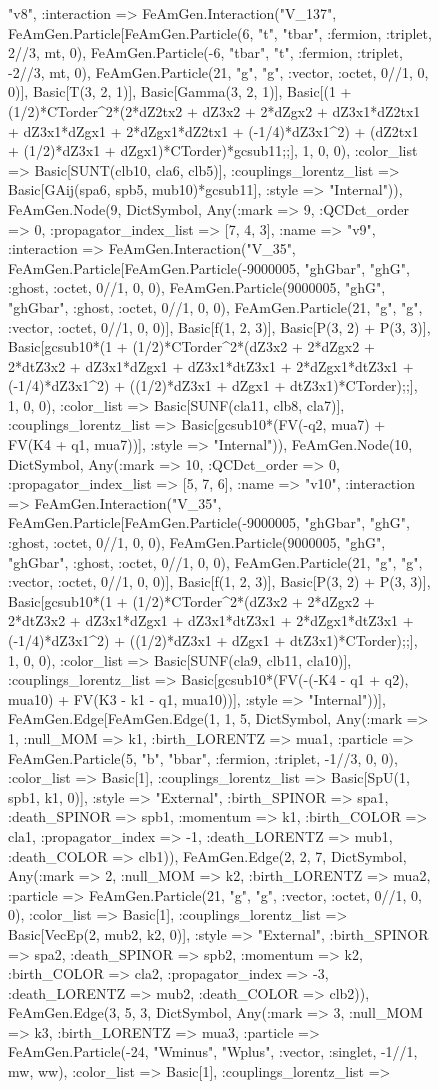 \documentclass{revtex4}
\begin{document}
\begin{figure}[!htb]
\begin{center}
{"v8", :interaction => FeAmGen.Interaction("V_137", FeAmGen.Particle[FeAmGen.Particle(6, "t", "tbar", :fermion, :triplet, 2//3, mt, 0), FeAmGen.Particle(-6, "tbar", "t", :fermion, :triplet, -2//3, mt, 0), FeAmGen.Particle(21, "g", "g", :vector, :octet, 0//1, 0, 0)], Basic[T(3, 2, 1)], Basic[Gamma(3, 2, 1)], Basic[(1 + (1/2)*CTorder^2*(2*dZ2tx2 + dZ3x2 + 2*dZgx2 + dZ3x1*dZ2tx1 + dZ3x1*dZgx1 + 2*dZgx1*dZ2tx1 + (-1/4)*dZ3x1^2) + (dZ2tx1 + (1/2)*dZ3x1 + dZgx1)*CTorder)*gcsub11;;], 1, 0, 0), :color_list => Basic[SUNT(clb10, cla6, clb5)], :couplings_lorentz_list => Basic[GAij(spa6, spb5, mub10)*gcsub11], :style => "Internal")), FeAmGen.Node(9, Dict{Symbol, Any}(:mark => 9, :QCDct_order => 0, :propagator_index_list => [7, 4, 3], :name => "v9", :interaction => FeAmGen.Interaction("V_35", FeAmGen.Particle[FeAmGen.Particle(-9000005, "ghGbar", "ghG", :ghost, :octet, 0//1, 0, 0), FeAmGen.Particle(9000005, "ghG", "ghGbar", :ghost, :octet, 0//1, 0, 0), FeAmGen.Particle(21, "g", "g", :vector, :octet, 0//1, 0, 0)], Basic[f(1, 2, 3)], Basic[P(3, 2) + P(3, 3)], Basic[gcsub10*(1 + (1/2)*CTorder^2*(dZ3x2 + 2*dZgx2 + 2*dtZ3x2 + dZ3x1*dZgx1 + dZ3x1*dtZ3x1 + 2*dZgx1*dtZ3x1 + (-1/4)*dZ3x1^2) + ((1/2)*dZ3x1 + dZgx1 + dtZ3x1)*CTorder);;], 1, 0, 0), :color_list => Basic[SUNF(cla11, clb8, cla7)], :couplings_lorentz_list => Basic[gcsub10*(FV(-q2, mua7) + FV(K4 + q1, mua7))], :style => "Internal")), FeAmGen.Node(10, Dict{Symbol, Any}(:mark => 10, :QCDct_order => 0, :propagator_index_list => [5, 7, 6], :name => "v10", :interaction => FeAmGen.Interaction("V_35", FeAmGen.Particle[FeAmGen.Particle(-9000005, "ghGbar", "ghG", :ghost, :octet, 0//1, 0, 0), FeAmGen.Particle(9000005, "ghG", "ghGbar", :ghost, :octet, 0//1, 0, 0), FeAmGen.Particle(21, "g", "g", :vector, :octet, 0//1, 0, 0)], Basic[f(1, 2, 3)], Basic[P(3, 2) + P(3, 3)], Basic[gcsub10*(1 + (1/2)*CTorder^2*(dZ3x2 + 2*dZgx2 + 2*dtZ3x2 + dZ3x1*dZgx1 + dZ3x1*dtZ3x1 + 2*dZgx1*dtZ3x1 + (-1/4)*dZ3x1^2) + ((1/2)*dZ3x1 + dZgx1 + dtZ3x1)*CTorder);;], 1, 0, 0), :color_list => Basic[SUNF(cla9, clb11, cla10)], :couplings_lorentz_list => Basic[gcsub10*(FV(-(-K4 - q1 + q2), mua10) + FV(K3 - k1 - q1, mua10))], :style => "Internal"))], FeAmGen.Edge[FeAmGen.Edge(1, 1, 5, Dict{Symbol, Any}(:mark => 1, :null_MOM => k1, :birth_LORENTZ => mua1, :particle => FeAmGen.Particle(5, "b", "bbar", :fermion, :triplet, -1//3, 0, 0), :color_list => Basic[1], :couplings_lorentz_list => Basic[SpU(1, spb1, k1, 0)], :style => "External", :birth_SPINOR => spa1, :death_SPINOR => spb1, :momentum => k1, :birth_COLOR => cla1, :propagator_index => -1, :death_LORENTZ => mub1, :death_COLOR => clb1)), FeAmGen.Edge(2, 2, 7, Dict{Symbol, Any}(:mark => 2, :null_MOM => k2, :birth_LORENTZ => mua2, :particle => FeAmGen.Particle(21, "g", "g", :vector, :octet, 0//1, 0, 0), :color_list => Basic[1], :couplings_lorentz_list => Basic[VecEp(2, mub2, k2, 0)], :style => "External", :birth_SPINOR => spa2, :death_SPINOR => spb2, :momentum => k2, :birth_COLOR => cla2, :propagator_index => -3, :death_LORENTZ => mub2, :death_COLOR => clb2)), FeAmGen.Edge(3, 5, 3, Dict{Symbol, Any}(:mark => 3, :null_MOM => k3, :birth_LORENTZ => mua3, :particle => FeAmGen.Particle(-24, "Wminus", "Wplus", :vector, :singlet, -1//1, mw, ww), :color_list => Basic[1], :couplings_lorentz_list => }
\end{center}
\end{figure}
\end{document}
